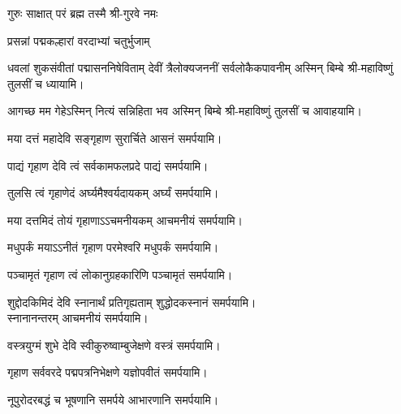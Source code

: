
{गुरुः साक्षात् परं ब्रह्म तस्मै श्री-गुरवे नमः}

\centering

{प्रसन्नां पद्मकल्हारां वरदाभ्यां चतुर्भुजाम्}

{धवलां शुकसंवीतां पद्मासननिषेविताम्}
{देवीं त्रैलोक्यजननीं सर्वलोकैकपावनीम्}
अस्मिन् बिम्बे श्री-महाविष्णुं तुलसीं च ध्यायामि।

{आगच्छ मम गेहेऽस्मिन् नित्यं सन्निहिता भव}
अस्मिन् बिम्बे श्री-महाविष्णुं तुलसीं च आवाहयामि।
\medskip

\medskip
{}
{मया दत्तं महादेवि सङ्गृहाण सुरार्चिते}
 आसनं समर्पयामि।\medskip

{पाद्यं गृहाण देवि त्वं सर्वकामफलप्रदे}
 पाद्यं समर्पयामि।\medskip

{तुलसि त्वं गृहाणेदं अर्घ्यमैश्वर्यदायकम्}
 अर्घ्यं समर्पयामि।\medskip

{मया दत्तमिदं तोयं गृहाणाऽऽचमनीयकम्}
 आचमनीयं समर्पयामि।\medskip

{मधुपर्कं मयाऽऽनीतं गृहाण परमेश्वरि}
मधुपर्कं समर्पयामि।\medskip

{पञ्चामृतं गृहाण त्वं लोकानुग्रहकारिणि}
पञ्चामृतं समर्पयामि।\medskip


{शुद्दोदकिमिदं देवि स्नानार्थं प्रतिगृह्यताम्}
 शुद्धोदकस्नानं समर्पयामि।\\
स्नानानन्तरम् आचमनीयं समर्पयामि।\medskip

 {वस्त्रयुग्मं शुभे देवि स्वीकुरुष्वाम्बुजेक्षणे}
 वस्त्रं समर्पयामि।\medskip

{गृहाण सर्ववरदे पद्मपत्रनिभेक्षणे}
 यज्ञोपवीतं समर्पयामि।\medskip

{नूपुरोदरबद्धं च भूषणानि समर्पये}
आभारणानि समर्पयामि।\medskip
 
